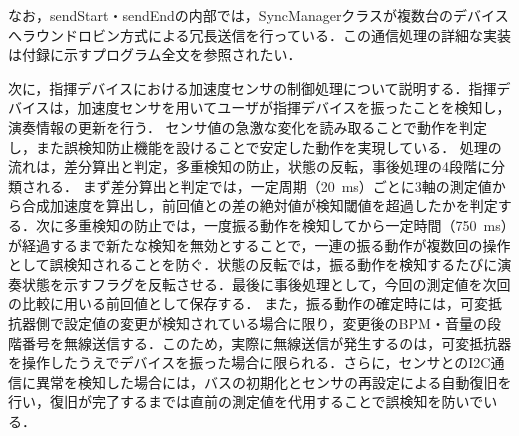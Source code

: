 \FloatBarrier



なお，sendStart・sendEndの内部では，SyncManagerクラスが複数台のデバイスへラウンドロビン方式による冗長送信を行っている．この通信処理の詳細な実装は付録に示すプログラム全文を参照されたい．
\fi

次に，指揮デバイスにおける加速度センサの制御処理について説明する．指揮デバイスは，加速度センサを用いてユーザが指揮デバイスを振ったことを検知し，演奏情報の更新を行う．
センサ値の急激な変化を読み取ることで動作を判定し，また誤検知防止機能を設けることで安定した動作を実現している．
処理の流れは，差分算出と判定，多重検知の防止，状態の反転，事後処理の4段階に分類される．
まず差分算出と判定では，一定周期（\SI{20}{ms}）ごとに3軸の測定値から合成加速度を算出し，前回値との差の絶対値が検知閾値を超過したかを判定する．次に多重検知の防止では，一度振る動作を検知してから一定時間（\SI{750}{ms}）が経過するまで新たな検知を無効とすることで，一連の振る動作が複数回の操作として誤検知されることを防ぐ．状態の反転では，振る動作を検知するたびに演奏状態を示すフラグを反転させる．最後に事後処理として，今回の測定値を次回の比較に用いる前回値として保存する．
また，振る動作の確定時には，可変抵抗器側で設定値の変更が検知されている場合に限り，変更後のBPM・音量の段階番号を無線送信する．このため，実際に無線送信が発生するのは，可変抵抗器を操作したうえでデバイスを振った場合に限られる．さらに，センサとのI2C通信に異常を検知した場合には，バスの初期化とセンサの再設定による自動復旧を行い，復旧が完了するまでは直前の測定値を代用することで誤検知を防いでいる．


